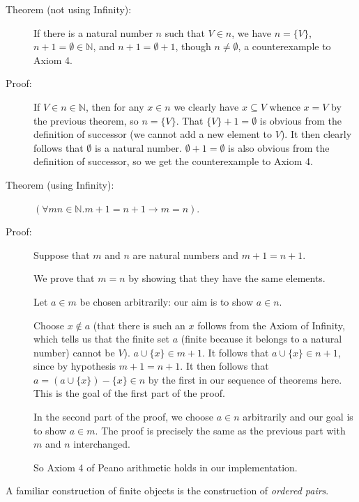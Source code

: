 \documentclass[12pt]{book}
\begin{document}
\begin{description}
\begin{description}
\end{description}



\item[Theorem (not using Infinity):] If there is a natural number $n$
such that $V \in n$, we have $n = \{V\}$, $n+1 = \emptyset \in
{\mathbb N}$, and $n+1 = \emptyset +1$, though $n \neq \emptyset$, a
counterexample to Axiom 4.

\item[Proof:] If $V \in n \in {\mathbb N}$, then for any $x \in n$ we
clearly have $x \subseteq V$ whence $x=V$ by the previous theorem, so
$n = \{V\}$.  That $\{V\}+1 = \emptyset$ is obvious from the
definition of successor (we cannot add a new element to $V$).  It then
clearly follows that $\emptyset$ is a natural number.  $\emptyset +1 =
\emptyset$ is also obvious from the definition of successor, so we get
the counterexample to Axiom 4.

\item[Theorem (using Infinity):] $(\forall mn \in {\mathbb N}.m+1 =
n+1 \rightarrow m=n)$.

\item[Proof:]  Suppose that $m$ and $n$ are natural numbers and $m+1 = n+1$.

We prove that $m=n$ by showing that they have the same elements.

Let $a \in m$ be chosen arbitrarily:  our aim is to show $a \in n$.

Choose $x \not\in a$ (that there is such an $x$ follows from the Axiom
of Infinity, which tells us that the finite set $a$ (finite because it
belongs to a natural number) cannot be $V$).  $a \cup \{x\} \in m+1$.
It follows that $a \cup \{x\} \in n+1$, since by hypothesis $m+1=n+1$.
It then follows that $a = (a \cup \{x\})-\{x\} \in n$ by the first in
our sequence of theorems here.  This is the goal of the first part of
the proof.

In the second part of the proof, we choose $a \in n$ arbitrarily and
our goal is to show $a \in m$.  The proof is precisely the same as the
previous part with $m$ and $n$ interchanged.

So Axiom 4 of Peano arithmetic holds in our implementation.

\end{description}

A familiar construction of finite objects is the construction of
{\em ordered pairs\/}.
\end{document}
